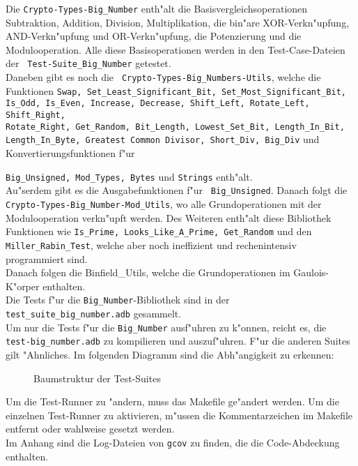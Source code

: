 Die {\tt Crypto-Types-Big\_Number} enth"alt die
Basisvergleichsoperationen Subtraktion, Addition, Division,
Multiplikation, die bin"are XOR-Verkn"upfung, AND-Verkn"upfung und
OR-Verkn"upfung, die Potenzierung und die Modulooperation.  Alle diese
Basisoperationen werden in den Test-Case-Dateien der {\tt
  Test-Suite\_Big\_Number} getestet.\\ Daneben gibt es noch die {\tt
  Crypto-Types-Big\_Numbers-Utils}, welche die Funktionen {\tt Swap,
  Set\_Least\_Significant\_Bit, Set\_Most\_Significant\_Bit, Is\_Odd,
  Is\_Even, Increase, Decrease, Shift\_Left, Rotate\_Left,
  Shift\_Right,\\ Rotate\_Right, Get\_Random, Bit\_Length,
  Lowest\_Set\_Bit, Length\_In\_Bit, Length\_In\_Byte, Greatest Common
  Divisor, Short\_Div, Big\_Div} und Konvertierungsfunktionen f"ur
{{\tt Big\_Unsigned, Mod\_Types, Bytes} und {\tt Strings}
  enth"alt.\\ Au"serdem gibt es die Ausgabefunktionen f"ur {\tt
    Big\_Unsigned}.  Danach folgt die {\tt
    Crypto-Types-Big\_Number-Mod\_Utils}, wo alle Grundoperationen mit
  der Modulooperation verkn"upft werden.  Des Weiteren enth"alt diese
  Bibliothek Funktionen wie {\tt Is\_Prime, Looks\_Like\_A\_Prime,
    Get\_Random} und den {\tt Miller\_Rabin\_Test}, welche aber noch
  ineffizient und rechenintensiv programmiert sind.\\ Danach folgen
  die Binfield\_Utils, welche die Grundoperationen im Gaulois-K"orper
  enthalten.\\

Die Tests f"ur die {\tt Big\_Number}-Bibliothek sind in der {\tt
  test\_suite\_big\_number.adb} gesammelt.\\ Um nur die Tests f"ur die
{\tt Big\_Number} ausf"uhren zu k"onnen, reicht es, die {\tt
  test-big\_number.adb} zu kompilieren und auszuf"uhren.  F"ur die
anderen Suites gilt "Ahnliches.  Im folgenden Diagramm sind die
Abh"angigkeit zu erkennen:

\begin{figure}[htp]
\centering
\caption{Baumstruktur der Test-Suites}
\label{}
\end{figure}

Um die Test-Runner zu "andern, muss das Makefile ge"andert werden.
Um die einzelnen Test-Runner zu aktivieren, m"ussen die Kommentarzeichen im Makefile entfernt oder wahlweise gesetzt werden.\\

Im Anhang sind die Log-Dateien von {\tt gcov} zu finden, die die Code-Abdeckung enthalten.

}
